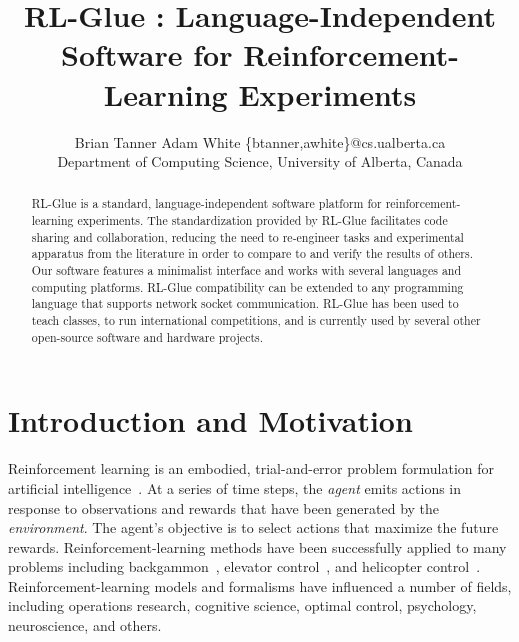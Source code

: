 \documentclass[twoside,11pt]{article}
\begin{document}
\title{RL-Glue : Language-Independent Software for Reinforcement-Learning Experiments}


\author{\name Brian Tanner \AND Adam White  \email \{btanner,awhite\}@cs.ualberta.ca \\
       \addr Department of Computing Science, University of Alberta, Canada}


\maketitle

\begin{abstract}
RL-Glue is a standard, language-independent software platform for reinforcement-learning experiments.  The standardization provided by RL-Glue facilitates code sharing and collaboration, reducing the need to re-engineer tasks and experimental apparatus from the literature in order to compare to and verify the results of others.  Our software features a minimalist interface and works with several languages and computing platforms. RL-Glue compatibility can be extended to any programming language that supports network socket communication. RL-Glue has been used to teach classes, to run international competitions, and is currently used by several other open-source software and hardware projects.
\end{abstract}

\section{Introduction and Motivation}
\vspace{-0.2cm}
Reinforcement learning is an embodied, trial-and-error problem formulation for artificial intelligence~\citep{rlbook, rlsurvey,ndp}.  At a series of time steps, the {\it agent} emits actions in response to observations and rewards that have been generated by the {\it environment}.  The agent's objective is to select actions that maximize the future rewards.  Reinforcement-learning methods have been successfully applied to many problems including %
  backgammon~\citep{tesauro:nc94}, elevator control~\citep{crites:mlj98},
and helicopter control~\citep{ng:iser04}.  
Reinforcement-learning models and formalisms have influenced a number of fields, including operations research, cognitive science, optimal control, psychology, neuroscience, and others.
\end{document}
